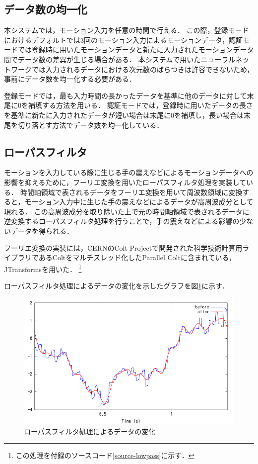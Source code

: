 \subsection{データ数の均一化}
本システムでは，モーション入力を任意の時間で行える．
この際，登録モードにおけるデフォルトでは3回のモーション入力によるモーションデータ，認証モードでは登録時に用いたモーションデータと新たに入力されたモーションデータ間でデータ数の差異が生じる場合がある．
本システムで用いたニューラルネットワークでは入力されるデータにおける次元数のばらつきは許容できないため，事前にデータ数を均一化する必要がある．

登録モードでは，最も入力時間の長かったデータを基準に他のデータに対して末尾に0を補填する方法を用いる．
認証モードでは，登録時に用いたデータの長さを基準に新たに入力されたデータが短い場合は末尾に0を補填し，長い場合は末尾を切り落とす方法でデータ数を均一化している．

\subsection{ローパスフィルタ}
モーションを入力している際に生じる手の震えなどによるモーションデータへの影響を抑えるために，フーリエ変換を用いたローパスフィルタ処理を実装している．
時間軸領域で表されるデータをフーリエ変換を用いて周波数領域に変換すると，モーション入力中に生じた手の震えなどによるデータが高周波成分として現れる．
この高周波成分を取り除いた上で元の時間軸領域で表されるデータに逆変換するローパスフィルタ処理を行うことで，手の震えなどによる影響の少ないデータを得られる．

フーリエ変換の実装には，CERNのColt Project\cite{4-colt-project}で開発された科学技術計算用ライブラリであるColtをマルチスレッド化したParallel Colt\cite{4-parallel-colt}に含まれている，JTransforms\cite{4-jtransforms}を用いた．
\footnote{この処理を付録のソースコード\ref{source-lowpass}に示す．}

ローパスフィルタ処理によるデータの変化を示したグラフを図\ref{graph-lowpass}に示す．

\begin{figure}[bthp]
  \centering
  \includegraphics[bb=0 0 360 216, width=12cm]{Graphs/lowpass.pdf}
  \caption{ローパスフィルタ処理によるデータの変化}
  \label{graph-lowpass}
\end{figure}


